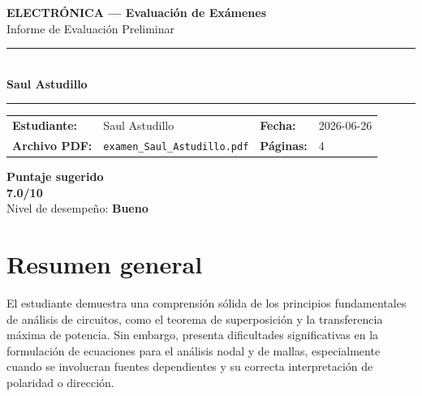 \documentclass[11pt,a4paper]{article}
\begin{document}
\begin{center}
  {\Large\bfseries\color{azulTitulo} ELECTRÓNICA --- Evaluación de Exámenes}\\[4pt]
  {\large Informe de Evaluación Preliminar}\\[12pt]
  \rule{\linewidth}{1.2pt}\\[6pt]
  {\LARGE\bfseries Saul Astudillo}\\[4pt]
  \rule{\linewidth}{0.6pt}
\end{center}

\vspace{4pt}
\begin{tcolorbox}[cajaTitulo, title=Datos del informe]
\begin{tabular}{@{}llll@{}}
  \textbf{Estudiante:}  & Saul Astudillo  &
  \textbf{Fecha:}       & 2026-06-26 \\[4pt]
  \textbf{Archivo PDF:} & \texttt{examen\_Saul\_Astudillo.pdf}  &
  \textbf{Páginas:}     & 4 \\
\end{tabular}
\end{tcolorbox}

\vspace{6pt}
\begin{center}
  \begin{tcolorbox}[
    enhanced,
    colback=white, colframe=desempeno_bueno,
    width=0.62\linewidth,
    boxrule=2pt,
    halign=center, valign=center,
    top=8pt, bottom=8pt,
  ]
    \centering
    {\large\bfseries Puntaje sugerido}\\[6pt]
    {\Huge\bfseries\color{desempeno_bueno} 7.0/10}\\[6pt]
    {\large Nivel de desempeño: \textbf{\color{desempeno_bueno} Bueno}}
  \end{tcolorbox}
\end{center}

\section*{Resumen general}
El estudiante demuestra una comprensión sólida de los principios fundamentales de análisis de circuitos, como el teorema de superposición y la transferencia máxima de potencia. Sin embargo, presenta dificultades significativas en la formulación de ecuaciones para el análisis nodal y de mallas, especialmente cuando se involucran fuentes dependientes y su correcta interpretación de polaridad o dirección.
\end{document}
